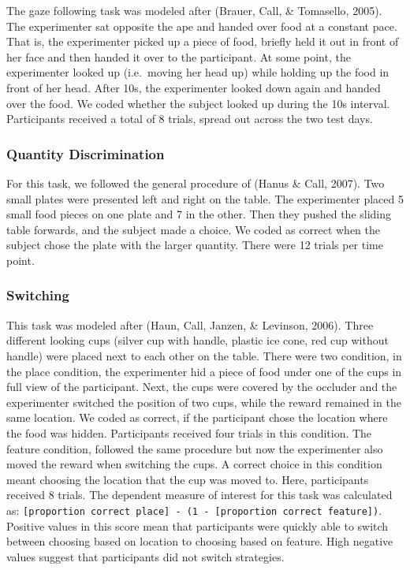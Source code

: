 \documentclass[10pt, letterpaper]{article}
\begin{document}
The gaze following task was modeled after (Brauer, Call, \& Tomasello,
2005). The experimenter sat opposite the ape and handed over food at a
constant pace. That is, the experimenter picked up a piece of food,
briefly held it out in front of her face and then handed it over to the
participant. At some point, the experimenter looked up (i.e.~moving her
head up) while holding up the food in front of her head. After 10s, the
experimenter looked down again and handed over the food. We coded
whether the subject looked up during the 10s interval. Participants
received a total of 8 trials, spread out across the two test days.

\hypertarget{quantity-discrimination}{%
\subsubsection{Quantity Discrimination}\label{quantity-discrimination}}

For this task, we followed the general procedure of (Hanus \& Call,
2007). Two small plates were presented left and right on the table. The
experimenter placed 5 small food pieces on one plate and 7 in the other.
Then they pushed the sliding table forwards, and the subject made a
choice. We coded as correct when the subject chose the plate with the
larger quantity. There were 12 trials per time point.

\hypertarget{switching}{%
\subsubsection{Switching}\label{switching}}

This task was modeled after (Haun, Call, Janzen, \& Levinson, 2006).
Three different looking cups (silver cup with handle, plastic ice cone,
red cup without handle) were placed next to each other on the table.
There were two condition, in the place condition, the experimenter hid a
piece of food under one of the cups in full view of the participant.
Next, the cups were covered by the occluder and the experimenter
switched the position of two cups, while the reward remained in the same
location. We coded as correct, if the participant chose the location
where the food was hidden. Participants received four trials in this
condition. The feature condition, followed the same procedure but now
the experimenter also moved the reward when switching the cups. A
correct choice in this condition meant choosing the location that the
cup was moved to. Here, participants received 8 trials. The dependent
measure of interest for this task was calculated as:
\texttt{{[}proportion\ correct\ place{]}\ -\ (1\ -\ {[}proportion\ correct\ feature{]})}.
Positive values in this score mean that participants were quickly able
to switch between choosing based on location to choosing based on
feature. High negative values suggest that participants did not switch
strategies.
\end{document}
